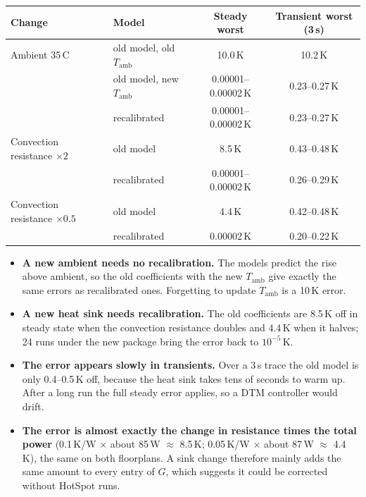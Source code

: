 \documentclass[11pt,a4paper]{article}
\newcommand{\degC}{\,\textdegree C}
\begin{document}
\begin{center}
\small
\begin{tabular}{@{}l l c c@{}}
\toprule
Change & Model & Steady worst & Transient worst (3\,s) \\
\midrule
Ambient 35\degC & old model, old $T_\text{amb}$ & 10.0\,K & 10.2\,K \\
 & old model, new $T_\text{amb}$ & 0.00001--0.00002\,K & 0.23--0.27\,K \\
 & recalibrated & 0.00001--0.00002\,K & 0.23--0.27\,K \\
\midrule
Convection resistance $\times 2$ & old model & 8.5\,K & 0.43--0.48\,K \\
 & recalibrated & 0.00001--0.00002\,K & 0.26--0.29\,K \\
\midrule
Convection resistance $\times 0.5$ & old model & 4.4\,K & 0.42--0.48\,K \\
 & recalibrated & 0.00002\,K & 0.20--0.22\,K \\
\bottomrule
\end{tabular}
\end{center}
\begin{itemize}
  \item \textbf{A new ambient needs no recalibration.} The models predict the rise above ambient,
        so the old coefficients with the new $T_\text{amb}$ give exactly the same errors as
        recalibrated ones. Forgetting to update $T_\text{amb}$ is a 10\,K error.
  \item \textbf{A new heat sink needs recalibration.} The old coefficients are 8.5\,K off in steady
        state when the convection resistance doubles and 4.4\,K when it halves; 24 runs under the
        new package bring the error back to $10^{-5}$\,K.
  \item \textbf{The error appears slowly in transients.} Over a 3\,s trace the old model is only
        0.4--0.5\,K off, because the heat sink takes tens of seconds to warm up. After a long run
        the full steady error applies, so a DTM controller would drift.
  \item \textbf{The error is almost exactly the change in resistance times the total power}
        (0.1\,K/W $\times$ about 85\,W $\approx$ 8.5\,K; 0.05\,K/W $\times$ about 87\,W
        $\approx$ 4.4\,K), the same on both floorplans. A sink change therefore mainly adds the same
        amount to every entry of $G$, which suggests it could be corrected without HotSpot runs.
\end{itemize}
\end{document}
